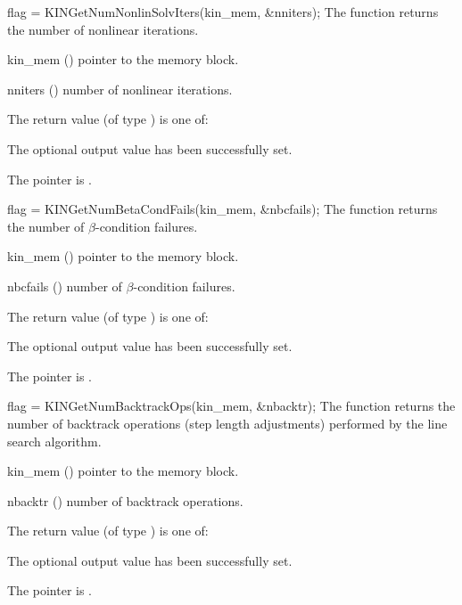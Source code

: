 {}
{
  flag = KINGetNumNonlinSolvIters(kin\_mem, \&nniters);
}
{
  The function  returns the number
  of nonlinear iterations.
}
{
  \begin{args}
  \item[kin\_mem] ()
    pointer to the {\kinsol} memory block.
  \item[nniters] ()
    number of nonlinear iterations.
  \end{args}
}
{
  The return value  (of type ) is one of:
  \begin{args}
  \item[\Id{KIN\_SUCCESS}] 
    The optional output value has been successfully set.
  \item[\Id{KIN\_MEM\_NULL}]
    The  pointer is .
  \end{args}
}
{}
{
  flag = KINGetNumBetaCondFails(kin\_mem, \&nbcfails);
}
{
  The function  returns the number
  of $\beta$-condition failures.
}
{
  \begin{args}[nbcfails]
  \item[kin\_mem] ()
    pointer to the {\kinsol} memory block.
  \item[nbcfails] ()
    number of $\beta$-condition failures.
  \end{args}
}
{
  The return value  (of type ) is one of:
  \begin{args}
  \item[\Id{KIN\_SUCCESS}] 
    The optional output value has been successfully set.
  \item[\Id{KIN\_MEM\_NULL}]
    The  pointer is .
  \end{args}
}
{}
{
  flag = KINGetNumBacktrackOps(kin\_mem, \&nbacktr);
}
{
  The function  returns the number of
  backtrack operations (step length adjustments) performed by the
  line search algorithm.
}
{
  \begin{args}
  \item[kin\_mem] ()
    pointer to the {\kinsol} memory block.
  \item[nbacktr] ()
    number of backtrack operations.
  \end{args}
}
{
  The return value  (of type ) is one of:
  \begin{args}
  \item[\Id{KIN\_SUCCESS}] 
    The optional output value has been successfully set.
  \item[\Id{KIN\_MEM\_NULL}]
    The  pointer is .
  \end{args}
}
